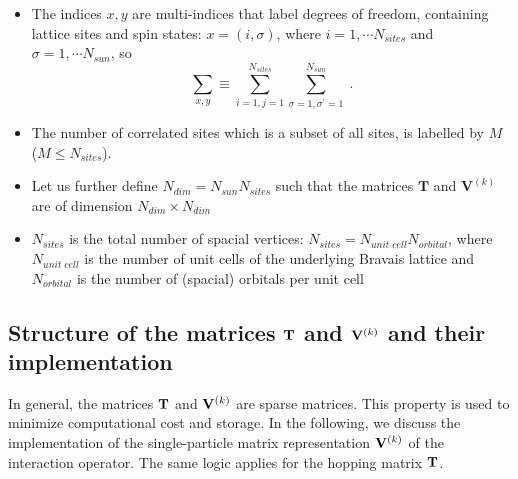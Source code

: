 \begin{itemize}
\item 
The indices $x,y$ are multi-indices that label degrees of freedom, containing lattice sites and spin states: $x=(i,\sigma)$, 
where $i=1,\cdots N_{sites}$ and $\sigma=1,\cdots N_{sun}$, so
\begin{equation}
\sum\limits_{x,y}\equiv
\sum\limits_{i=1,j=1}^{N_{sites}}\sum\limits_{\sigma=1,\sigma^{\prime}=1}^{N_{sun}}\;.
\end{equation}

\item The number of correlated sites which is a subset of all sites, is labelled by $M$  ($M\leq N_{sites}$).

\item Let us further define  $N_{dim}=N_{sun} N_{sites}$ such that the matrices $\bm{T}$ and $\bm{V}^{(k)}$ are  of dimension $N_{dim}\times N_{dim}$ 

\item $N_{sites}$ is the total number of spacial vertices: $N_{sites}=N_{unit\;cell} N_{orbital}$, where $N_{unit\;cell}$ is the number of unit cells of the underlying Bravais lattice and
$N_{orbital}$ is the number of (spacial) orbitals per unit cell 

\end{itemize}


\subsection{Structure of the matrices ${\bf T}$ and ${\bf V}^{(k)}$ and their implementation}

In general, the matrices ${\bf T}$ and ${\bf V}^{(k)}$ are sparse matrices. 
This property is used to minimize computational cost and storage.
In the following, we discuss the implementation of the single-particle matrix representation ${\bf V}^{(k)}$ of the interaction operator. 
The same logic applies for the hopping matrix ${\bf T}$.

